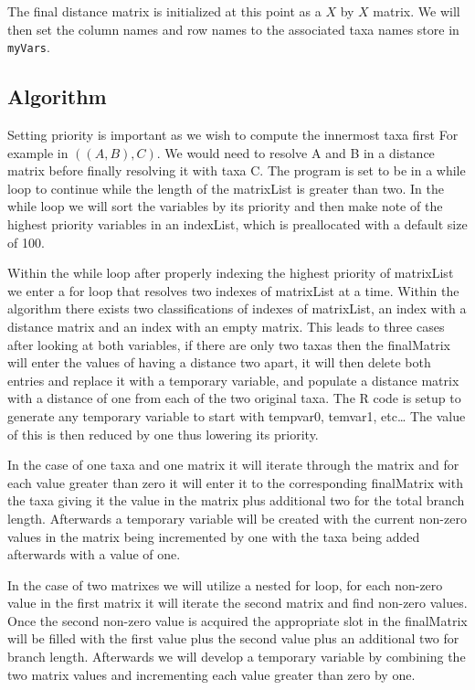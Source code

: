\documentclass{article}
\begin{document}
The final distance matrix is initialized at this point as a $X$ by $X$ matrix. We will then set the column names and row names to the associated taxa names store in {\tt myVars}. 

\subsection{Algorithm}

Setting priority is important as we wish to compute the innermost taxa first For example in $((A,B),C)$. We would need to resolve A and B in a distance matrix before finally resolving it with taxa C. The program is set to be in a while loop to continue while the length of the matrixList is greater than two. In the while loop we will sort the variables by its priority and then make note of the highest priority variables in an indexList, which is preallocated with a default size of 100.

Within the while loop after properly indexing the highest priority of matrixList we enter a for loop that resolves two indexes of matrixList at a time. Within the algorithm there exists two classifications of indexes of matrixList, an index with a distance matrix and an index with an empty matrix. This leads to three cases after looking at both variables, if there are only two taxas then the finalMatrix will enter the values of having a distance two apart, it will then delete both entries and replace it with a temporary variable, and populate a distance matrix with a distance of one from each of the two original taxa. The R code is setup to generate any temporary variable to start with tempvar0, temvar1, etc… The value of this is then reduced by one thus lowering its priority. 

In the case of one taxa and one matrix it will iterate through the matrix and for each value greater than zero it will enter it to the corresponding finalMatrix with the taxa giving it the value in the matrix plus additional two for the total branch length. Afterwards a temporary variable will be created with the current non-zero values in the matrix being incremented by one with the taxa being added afterwards with a value of one.

In the case of two matrixes we will utilize a nested for loop, for each non-zero value in the first matrix it will iterate the second matrix and find non-zero values. Once the second non-zero value is acquired the appropriate slot in the finalMatrix will be filled with the first value plus the second value plus an additional two for branch length. Afterwards we will develop a temporary variable by combining the two matrix values and incrementing each value greater than zero by one.
\end{document}
